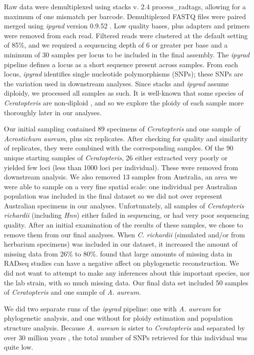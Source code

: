 \documentclass[12pt]{article}
\begin{document}
\begin{flushleft}
Raw data were demultiplexed using stacks v. 2.4 \autocite{Catchen2011, Catchen2013} process\_radtags, allowing for a maximum of one mismatch per barcode. Demultiplexed FASTQ files were paired merged using \textit{ipyrad} version 0.9.52 \autocite{Eaton2020}. Low quality bases, plus adapters and primers were removed from each read. Filtered reads were clustered at the default setting of 85\%, and we required a sequencing depth of 6 or greater per base and a minimum of 30 samples per locus to be included in the final assembly. The \textit{ipyrad} pipeline defines a locus as a short sequence present across samples. From each locus, \textit{ipyrad} identifies single nucleotide polymorphisms (SNPs); these SNPs are the variation used in downstream analyses. Since stacks and \textit{ipyrad} assume diploidy, we processed all samples as such. It is well-known that some species of \textit{Ceratopteris} are non-diploid \autocite{Adjie2007, Masuyama2010}, and so we explore the ploidy of each sample more thoroughly later in our analyses.

Our initial sampling contained 89 specimens of \textit{Ceratopteris} and one sample of \textit{Acrostichum aureum}, plus six replicates. After checking for quality and similarity of replicates, they were combined with the corresponding samples. Of the 90 unique starting samples of \textit{Ceratopteris}, 26 either extracted very poorly or yielded few loci (less than 1000 loci per individual). These were removed from downstream analysis. We also removed 13 samples from Australia, an area we were able to sample on a very fine spatial scale: one individual per Australian population was included in the final dataset so we did not over represent Australian specimens in our analyses. Unfortunately, all samples of \textit{Ceratopteris richardii} (including \textit{Hnn}) either failed in sequencing, or had very poor sequencing quality. After an initial examination of the results of these samples, we chose to remove them from our final analyses. When \textit{C. richardii} (simulated and/or from herbarium specimens) was included in our dataset, it increased the amount of missing data from 26\% to 80\%. \textcite{Hou2016} found that large amounts of missing data in RADseq studies can have a negative affect on phylogenetic reconstruction. We did not want to attempt to make any inferences about this important species, nor the lab strain, with so much missing data. Our final data set included 50 samples of \textit{Ceratopteris} and one sample of \textit{A. aureum}. 

We did two separate runs of the \textit{ipyrad} pipeline: one with \textit{A. aureum} for phylogenetic analysis, and one without for ploidy estimation and population structure analysis. Because \textit{A. aureum} is sister to \textit{Ceratopteris} and separated by over 30 million years \autocite{PPGI}, the total number of SNPs retrieved for this individual was quite low.


\end{flushleft}
\end{document}
